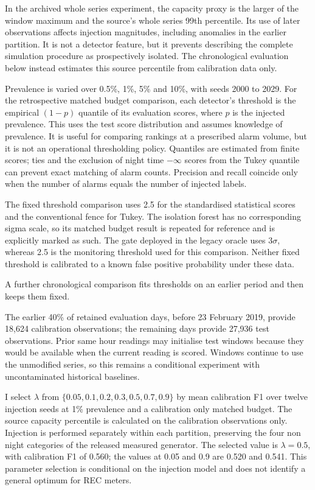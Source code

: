 \documentclass[11pt,a4paper]{article}
\begin{document}
In the archived whole series experiment, the capacity proxy is the larger of the window maximum and the source's whole series 99th percentile. Its use of later observations affects injection magnitudes, including anomalies in the earlier partition. It is not a detector feature, but it prevents describing the complete simulation procedure as prospectively isolated. The chronological evaluation below instead estimates this source percentile from calibration data only.

Prevalence is varied over 0.5\%, 1\%, 5\% and 10\%, with seeds 2000 to 2029. For the retrospective matched budget comparison, each detector's threshold is the empirical $(1-p)$ quantile of its evaluation scores, where $p$ is the injected prevalence. This uses the test score distribution and assumes knowledge of prevalence. It is useful for comparing rankings at a prescribed alarm volume, but it is not an operational thresholding policy. Quantiles are estimated from finite scores; ties and the exclusion of night time $-\infty$ scores from the Tukey quantile can prevent exact matching of alarm counts. Precision and recall coincide only when the number of alarms equals the number of injected labels.

The fixed threshold comparison uses 2.5 for the standardised statistical scores and the conventional fence for Tukey. The isolation forest has no corresponding sigma scale, so its matched budget result is repeated for reference and is explicitly marked as such. The gate deployed in the legacy oracle uses $3\sigma$, whereas 2.5 is the monitoring threshold used for this comparison. Neither fixed threshold is calibrated to a known false positive probability under these data.


A further chronological comparison fits thresholds on an earlier period and then keeps them fixed.


The earlier 40\% of retained evaluation days, before 23 February 2019, provide 18,624 calibration observations; the remaining days provide 27,936 test observations. Prior same hour readings may initialise test windows because they would be available when the current reading is scored. Windows continue to use the unmodified series, so this remains a conditional experiment with uncontaminated historical baselines.

I select $\lambda$ from $\{0.05,0.1,0.2,0.3,0.5,0.7,0.9\}$ by mean calibration F1 over twelve injection seeds at 1\% prevalence and a calibration only matched budget. The source capacity percentile is calculated on the calibration observations only. Injection is performed separately within each partition, preserving the four non night categories of the released measured generator. The selected value is $\lambda=0.5$, with calibration F1 of 0.560; the values at 0.05 and 0.9 are 0.520 and 0.541. This parameter selection is conditional on the injection model and does not identify a general optimum for REC meters.
\end{document}
